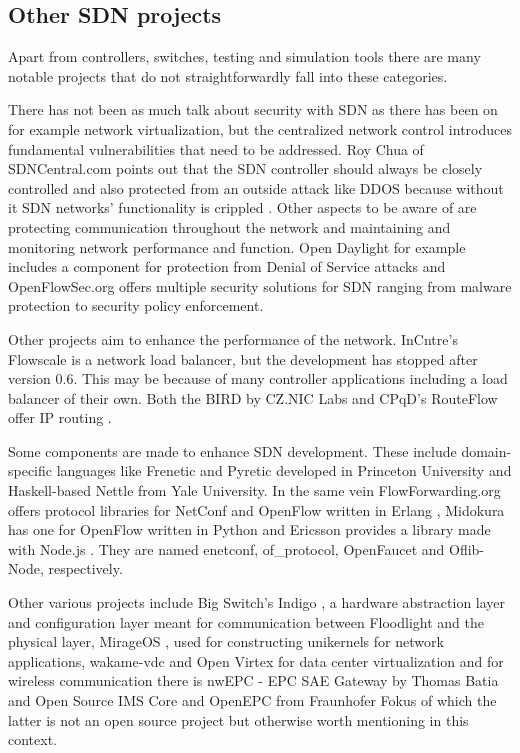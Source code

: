 \subsection{Other SDN projects}

Apart from controllers, switches, testing and simulation tools there are many notable projects that do not straightforwardly fall into these categories.

There has not been as much talk about security with SDN as there has been on for example network virtualization, but the centralized network control introduces fundamental vulnerabilities that need to be addressed. Roy Chua of SDNCentral.com points out that the SDN controller should always be closely controlled and also protected from an outside attack like DDOS because without it SDN networks' functionality is crippled \cite{CHU2}. Other aspects to be aware of are protecting communication throughout the network and maintaining and monitoring network performance and function. Open Daylight for example includes a component for protection from Denial of Service attacks and OpenFlowSec.org offers multiple security solutions for SDN ranging from malware protection to security policy enforcement.

Other projects aim to enhance the performance of the network. InCntre’s Flowscale \cite{Flowscale} is a network load balancer, but the development has stopped after version 0.6. This may be because of many controller applications including a load balancer of their own. Both the BIRD by CZ.NIC Labs and CPqD’s RouteFlow offer IP routing \cite{Bird, RouteFlow}.

Some components are made to enhance SDN development. These include domain-specific languages like Frenetic and Pyretic developed in Princeton University \cite{Frenetic} and Haskell-based Nettle \cite{Nettle} from Yale University. In the same vein FlowForwarding.org offers protocol libraries for NetConf and OpenFlow written in Erlang \cite{enetconf,ofproto}, Midokura has one for OpenFlow written in Python \cite{OpenFaucet} and Ericsson provides a library made with Node.js \cite{Node}. They are named enetconf, of\_protocol, OpenFaucet and Oflib-Node, respectively. 

Other various projects include Big Switch’s Indigo \cite{Indigo}, a hardware abstraction layer and configuration layer meant for communication between Floodlight and the physical layer, MirageOS \cite{Mirage}, used for constructing unikernels for network applications, wakame-vdc and Open Virtex for data center virtualization \cite{wakame, Virtex} and for wireless communication there is nwEPC - EPC SAE Gateway by Thomas Batia \cite{nwEPC} and Open Source IMS Core and OpenEPC from Fraunhofer Fokus \cite{IMSCORE, OpenEPC} of which the latter is not an open source project but otherwise worth mentioning in this context. 

